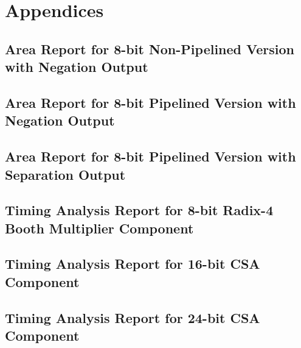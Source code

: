 \section{Appendices}
\subsection{Area Report for 8-bit Non-Pipelined Version with Negation Output}
\label{sec:ap_1}
{
	\footnotesize{
		
	}
}
\subsection{Area Report for 8-bit Pipelined Version with Negation Output}
\label{sec:ap_2}

{
	\footnotesize{
		
	}
}
\subsection{Area Report for 8-bit Pipelined Version with Separation Output}
\label{sec:ap_3}

{
	\footnotesize{
		
	}
}

\subsection{Timing Analysis Report for 8-bit Radix-4 Booth Multiplier Component}
\label{sec:ap_4}

{
	\footnotesize{
		
	}
}

\subsection{Timing Analysis Report for 16-bit CSA Component}
\label{sec:ap_5}

{
	\footnotesize{
		
	}
}

\subsection{Timing Analysis Report for 24-bit CSA Component}
\label{sec:ap_6}

{
	\footnotesize{
		
	}
}


